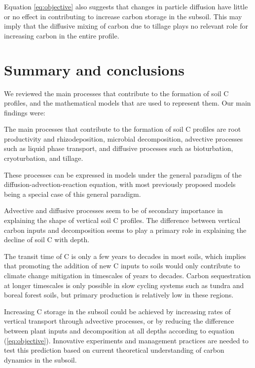 \documentclass[11pt, oneside, a4paper]{article}   	%
\begin{document}
Equation \ref{eq:objective} also suggests that changes in particle diffusion have little or no effect in contributing to increase carbon storage in the subsoil. This may imply that the diffusive mixing of carbon due to tillage plays no relevant role for increasing carbon in the entire profile. 

\section{Summary and conclusions}
We reviewed the main processes that contribute to the formation of soil C profiles, and the mathematical models that are used to represent them. 
Our main findings were: 
\begin{enumerate*}
\item The main processes that contribute to the formation of soil C profiles are root productivity and rhizodeposition, microbial decomposition, advective processes such as liquid phase transport, and diffusive processes such as bioturbation, cryoturbation, and tillage. 
\item These processes can be expressed in models under the general paradigm of the diffusion-advection-reaction equation, with most previously proposed models being a special case of this general paradigm. 
\item Advective and diffusive processes seem to be of secondary importance in explaining the shape of vertical soil C profiles. The difference between vertical carbon inputs and decomposition seems to play a primary role in explaining the decline of soil C with depth. 
\item The transit time of C is only a few years to decades in most soils, which implies that promoting the addition of new C inputs to soils would only contribute to climate change mitigation in timescales of years to decades. Carbon sequestration at longer timescales is only possible in slow cycling systems such as tundra and boreal forest soils, but primary production is relatively low in these regions.
\item Increasing C storage in the subsoil could be achieved by increasing rates of vertical transport through advective processes, or by reducing the difference between plant inputs and decomposition at all depths according to equation (\ref{eq:objective}). Innovative experiments and management practices are needed to test this prediction based on current theoretical understanding of carbon dynamics in the subsoil. 
\end{enumerate*}
\end{document}
